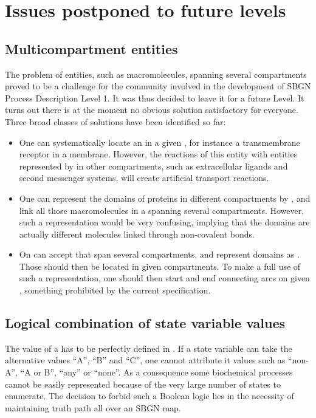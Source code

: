 \chapter{Issues postponed to future levels}\label{sec:postponed}

\section{Multicompartment entities}
\label{sec: unresolved multi-comp ents}

The problem of entities, such as macromolecules, spanning several compartments proved to be a challenge for the community involved in the development of SBGN Process Description Level 1. It was thus decided to leave it for a future Level. It turns out there is at the moment no obvious solution satisfactory for everyone. Three broad classes of solutions have been identified so far:

\begin{itemize}
\item One can systematically locate an  in a given , for instance a transmembrane receptor in a membrane. However, the reactions of this entity with entities represented by  in other compartments, such as extracellular ligands and second messenger systems, will create artificial transport reactions.
\item One can represent the domains of proteins in different compartments by , and link all those macromolecules in a  spanning several compartments. However, such a representation would be very confusing, implying that the domains are actually different molecules linked through non-covalent bonds.
\item On can accept  that span several compartments, and represent domains as . Those  should then be located in given compartments. To make a full use of such a representation, one should then start and end connecting arcs on given , something prohibited by the current specification.
\end{itemize}

\section{Logical combination of state variable values}

The value of a  has to be perfectly defined in \SBGNPDLone. If a state variable can take the alternative values ``A'', ``B'' and ``C'',  one cannot attribute it values such as ``non-A'', ``A or B'', ``any'' or ``none''. As a consequence some biochemical processes cannot be easily represented because of the very large number of states to enumerate. The decision to forbid such a Boolean logic lies in the necessity of maintaining truth path all over an SBGN map. 

